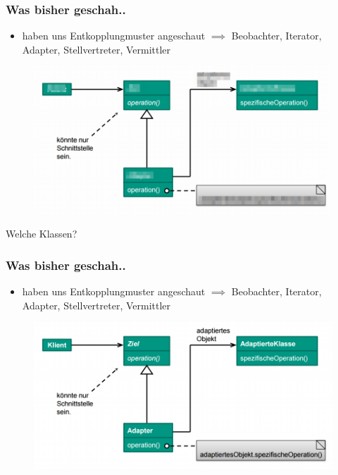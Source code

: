 \documentclass[18pt]{beamer}
\begin{document}
	\begin{frame}
		\frametitle{Was bisher geschah..}
		\begin{itemize}
			\item haben uns Entkopplungmuster angeschaut
			\linebreak $\implies$ Beobachter, Iterator, Adapter, Stellvertreter, Vermittler
		\end{itemize}
		\begin{figure}
			\includegraphics[scale=0.33]{./pics/tut4/adap-obj-mod.png}
		\end{figure}
		Welche Klassen?
	\end{frame}
	
	\begin{frame}
		\frametitle{Was bisher geschah..}
		\begin{itemize}
			\item haben uns Entkopplungmuster angeschaut
			\linebreak $\implies$ Beobachter, Iterator, Adapter, Stellvertreter, Vermittler
		\end{itemize}
		\begin{figure}
			\includegraphics[scale=0.45]{./pics/tut3/adap-obj.png}
		\end{figure}
	\end{frame}
	
\end{document}
